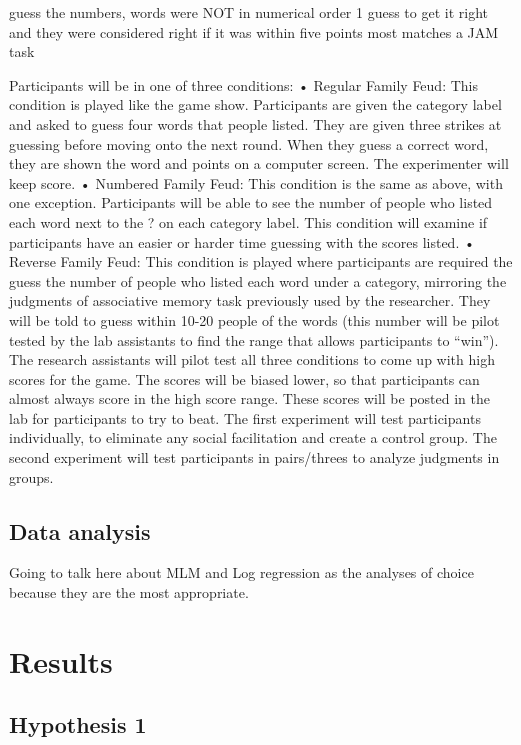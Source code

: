 \documentclass[man]{apa6}
\begin{document}
guess the numbers, words were NOT in numerical order
1 guess to get it right and they were considered right if it was within five points
most matches a JAM task

Participants will be in one of three conditions:
• Regular Family Feud: This condition is played like the game show. Participants are given the category label and asked to guess four words that people listed. They are given three strikes at guessing before moving onto the next round. When they guess a correct word, they are shown the word and points on a computer screen. The experimenter will keep score.
• Numbered Family Feud: This condition is the same as above, with one exception. Participants will be able to see the number of people who listed each word next to the ? on each category label. This condition will examine if participants have an easier or harder time guessing with the scores listed.
• Reverse Family Feud: This condition is played where participants are required the guess the number of people who listed each word under a category, mirroring the judgments of associative memory task previously used by the researcher. They will be told to guess within 10-20 people of the words (this number will be pilot tested by the lab assistants to find the range that allows participants to \enquote{win}).\\
The research assistants will pilot test all three conditions to come up with high scores for the game. The scores will be biased lower, so that participants can almost always score in the high score range. These scores will be posted in the lab for participants to try to beat. The first experiment will test participants individually, to eliminate any social facilitation and create a control group. The second experiment will test participants in pairs/threes to analyze judgments in groups.

\hypertarget{data-analysis}{%
\subsection{Data analysis}\label{data-analysis}}

Going to talk here about MLM and Log regression as the analyses of choice because they are the most appropriate.

\hypertarget{results}{%
\section{Results}\label{results}}

\hypertarget{hypothesis-1}{%
\subsection{Hypothesis 1}\label{hypothesis-1}}
\end{document}
